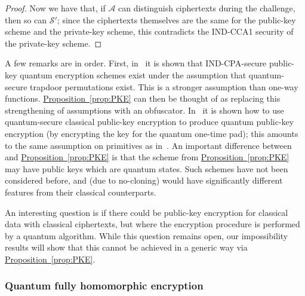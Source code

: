 \documentclass[11pt]{article}
\numberwithin{equation}{section}
\newcommand{\expref}[2]{\texorpdfstring{\hyperref[#2]{#1~\ref{#2}}}{#1~\ref{#2}}}
\newcommand{\algo}{\mathcal}
\begin{document}
{\begin{proof}
Now we have that, if $\algo A$ can distinguish ciphertexts during the challenge, then so can $\algo S'$; since the ciphertexts themselves are the same for the public-key scheme and the private-key scheme, this contradicts the IND-CCA1 security of the private-key scheme.
\end{proof}

A few remarks are in order. First, in~\cite{ABFGSS15} it is shown that IND-CPA-secure public-key quantum encryption schemes exist under the assumption that quantum-secure trapdoor permutations exist. This is a stronger assumption than one-way functions. \expref{Proposition}{prop:PKE} can then be thought of as replacing this strengthening of assumptions with an obfuscator. In~\cite{BJ15} it is shown how to use quantum-secure classical public-key encryption to produce quantum public-key encryption (by encrypting the key for the quantum one-time pad); this amounts to the same assumption on primitives as in~\cite{ABFGSS15}. An important difference between~\cite{ABFGSS15, BJ15} and \expref{Proposition}{prop:PKE} is that the scheme from \expref{Proposition}{prop:PKE} may have public keys which are quantum states. Such schemes have not been considered before, and (due to no-cloning) would have significantly different features from their classical counterparts.

An interesting question is if there could be public-key encryption for classical data with classical ciphertexts, but where the encryption procedure is performed by a quantum algorithm. While this question remains open, our impossibility results will show that this cannot be achieved in a generic way via \expref{Proposition}{prop:PKE}.

\subsubsection{Quantum fully homomorphic encryption}

}
\end{document}
